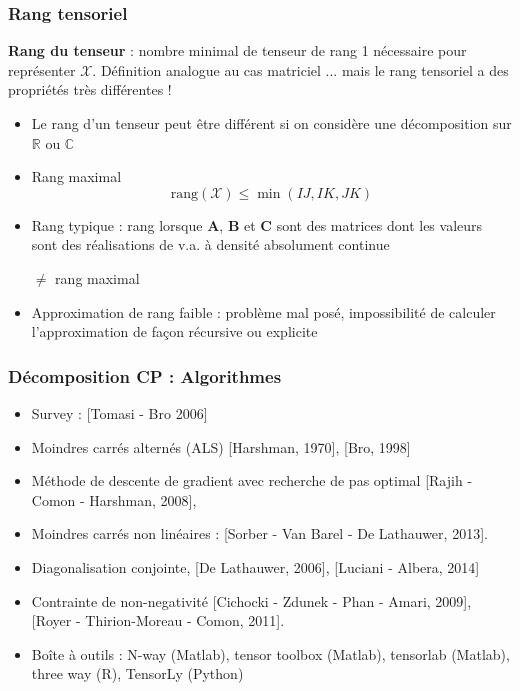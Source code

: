 \documentclass[9pt]{beamer}
\begin{document}
\begin{frame}\frametitle{Rang tensoriel}

\textbf{Rang du tenseur} : nombre minimal de tenseur de rang 1 nécessaire pour représenter 
$\mathcal{X}$.
Définition analogue au cas matriciel ... mais le rang tensoriel a des propriétés très différentes !
\\[1ex]
\begin{itemize}[label=\tiny$\blacksquare$]
\item Le rang d'un tenseur peut être différent si on considère une décomposition sur $\mathbb{R}$ ou $\mathbb{C}$
\item \alert{Rang maximal}
\[
\text{rang}(\mathcal{X}) \leq \min (IJ, IK, JK)
\]
\item \alert{Rang typique} : rang lorsque $\mathbf{A}$, $\mathbf{B}$ et $\mathbf{C}$ sont des matrices dont les valeurs sont des réalisations de v.a. à densité absolument continue 

$\neq$ rang maximal
\item Approximation de rang faible : problème mal posé, impossibilité de calculer l'approximation de façon récursive ou explicite
\end{itemize}
\end{frame}

\begin{frame}
\frametitle{Décomposition CP : Algorithmes}

\begin{itemize}[label=\tiny$\blacksquare$]
\item Survey :  [Tomasi - Bro 2006]  
\item Moindres carrés alternés (ALS) [Harshman, 1970], [Bro, 1998]
\item Méthode de descente de gradient avec recherche de pas optimal
[Rajih - Comon - Harshman, 2008], 
\item Moindres carrés non linéaires :
[Sorber - Van Barel - De Lathauwer, 2013]. 
\item Diagonalisation conjointe, 
[De Lathauwer, 2006], [Luciani - Albera, 2014]
\item Contrainte de non-negativité [Cichocki - Zdunek - Phan -  Amari, 2009], [Royer - Thirion-Moreau - Comon, 2011]. 
\item Boîte à outils : N-way (Matlab), tensor toolbox (Matlab), tensorlab (Matlab), three way (R), TensorLy (Python)
\end{itemize}
\end{frame}
\end{document}

